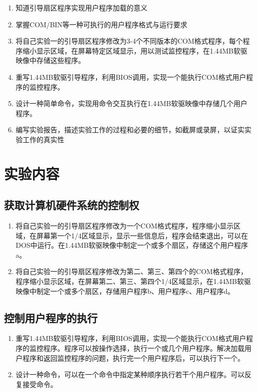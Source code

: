 \documentclass[a4paper, 11pt]{article} %
\begin{document}
\begin{enumerate}
  \item 知道引导扇区程序实现用户程序加载的意义
  \item 掌握COM/BIN等一种可执行的用户程序格式与运行要求
  \item 将自己实验一的引导扇区程序修改为3-4个不同版本的COM格式程序，每个程序缩小显示区域，在屏幕特定区域显示，用以测试监控程序，在1.44MB软驱映像中存储这些程序。
  \item 重写1.44MB软驱引导程序，利用BIOS调用，实现一个能执行COM格式用户程序的监控程序。
  \item 设计一种简单命令，实现用命令交互执行在1.44MB软驱映像中存储几个用户程序。
  \item 编写实验报告，描述实验工作的过程和必要的细节，如截屏或录屏，以证实实验工作的真实性
\end{enumerate}

\section{实验内容}

\subsection{获取计算机硬件系统的控制权}

\begin{enumerate}
  \item 将自己实验一的引导扇区程序修改为一个COM格式程序，程序缩小显示区域，在屏幕第一个1/4区域显示，显示一些信息后，程序会结束退出，可以在DOS中运行。在1.44MB软驱映像中制定一个或多个扇区，存储这个用户程序a。
  \item 将自己实验一的引导扇区程序修改为第二、第三、第四个的COM格式程序，程序缩小显示区域，在屏幕第二、第三、第四个1/4区域显示，在1.44MB软驱映像中制定一个或多个扇区，存储用户程序b、用户程序c、用户程序d。
\end{enumerate}

\subsection{控制用户程序的执行}

\begin{enumerate}
  \item 重写1.44MB软驱引导程序，利用BIOS调用，实现一个能执行COM格式用户程序的监控程序。程序可以按操作选择，执行一个或几个用户程序。解决加载用户程序和返回监控程序的问题，执行完一个用户程序后，可以执行下一个。
  \item 设计一种命令，可以在一个命令中指定某种顺序执行若干个用户程序。可以反复接受命令。
\end{enumerate}
\end{document}
